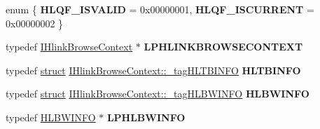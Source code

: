 \begin{DoxyCompactItemize}
enum \{ {\bfseries H\+L\+Q\+F\+\_\+\+I\+S\+V\+A\+L\+ID} = 0x00000001, 
{\bfseries H\+L\+Q\+F\+\_\+\+I\+S\+C\+U\+R\+R\+E\+NT} = 0x00000002
 \}
\item 
\mbox{\label{interface_i_hlink_browse_context_aef8a9f6aecd70d4381e17e80255b11a2}} 
typedef \hyperlink{interface_i_hlink_browse_context}{I\+Hlink\+Browse\+Context} $\ast$ {\bfseries L\+P\+H\+L\+I\+N\+K\+B\+R\+O\+W\+S\+E\+C\+O\+N\+T\+E\+XT}
\item 
\mbox{\label{interface_i_hlink_browse_context_a633ab6be183668cdfde58e1d5f5c2816}} 
typedef \hyperlink{interfacestruct}{struct} \hyperlink{struct_i_hlink_browse_context_1_1__tag_h_l_t_b_i_n_f_o}{I\+Hlink\+Browse\+Context\+::\+\_\+tag\+H\+L\+T\+B\+I\+N\+FO} {\bfseries H\+L\+T\+B\+I\+N\+FO}
\item 
\mbox{\label{interface_i_hlink_browse_context_ac51fa5612c5b6e2fe821d5e874fe67e7}} 
typedef \hyperlink{interfacestruct}{struct} \hyperlink{struct_i_hlink_browse_context_1_1__tag_h_l_b_w_i_n_f_o}{I\+Hlink\+Browse\+Context\+::\+\_\+tag\+H\+L\+B\+W\+I\+N\+FO} {\bfseries H\+L\+B\+W\+I\+N\+FO}
\item 
\mbox{\label{interface_i_hlink_browse_context_a74cd1e76729bd7494f7ebe3a787c15e0}} 
typedef \hyperlink{struct_i_hlink_browse_context_1_1__tag_h_l_b_w_i_n_f_o}{H\+L\+B\+W\+I\+N\+FO} $\ast$ {\bfseries L\+P\+H\+L\+B\+W\+I\+N\+FO}
\end{DoxyCompactItemize}
